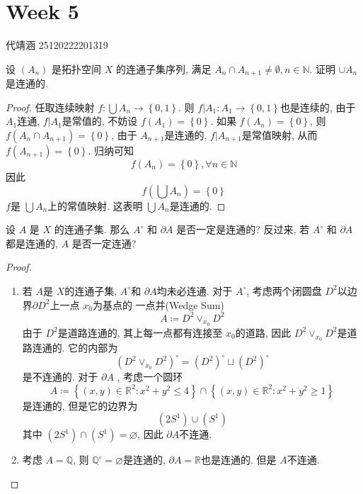 \documentclass[../main.tex]{subfiles}
\begin{document}
\ifSubfilesClassLoaded{

    
    \setcounter{chapter}{4}
}{}

\chapter{ Week 5 }
 代靖涵 25120222201319
\begin{exercise}{}{}
设 $(A_n)$ 是拓扑空间 $X$ 的连通子集序列, 满足 $A_n \cap A_{n+1} \neq \emptyset, n \in \mathbb{N}$. 证明 $\cup A_n$ 是连通的.
\end{exercise}

\begin{proof}
    任取连续映射 \(  f: \bigcup A_{n}\to \left\{ 0,1 \right\}  \). 则 \(  f|A_{1}: A_1\to \left\{ 0,1 \right\}  \)也是连续的, 由于 \(  A_1  \)连通, \(  f|A_{1}  \)是常值的, 不妨设 \(  f\left( A_1 \right)= \left\{ 0 \right\}   \).  如果 \(  f\left( A_{n} \right)= \left\{ 0 \right\}   \), 则 \(  f\left( A_{n}\cap A_{n+ 1} \right)= \left\{ 0 \right\}   \), 由于 \(  A_{n+ 1}  \)是连通的,  \(  f|A_{n+ 1}  \)是常值映射, 从而 \(  f\left( A_{n+ 1} \right)= \left\{ 0 \right\}   \). 归纳可知 \[
    f\left( A_{n} \right)=\left\{ 0 \right\},\forall n \in \mathbb{N}  
    \]因此 \[
    f\left( \bigcup A_{n} \right)= \left\{ 0 \right\} 
    \] \(  f  \)是 \(  \bigcup A_{n}  \)上的常值映射. 这表明 \(  \bigcup A_{n}  \)是连通的.            
\end{proof}
\begin{exercise}{}{}
设 $A$ 是 $X$ 的连通子集. 那么 $A^\circ$ 和 $\partial A$ 是否一定是连通的? 反过来, 若 $A^\circ$ 和 $\partial A$ 都是连通的, $A$ 是否一定连通?
\end{exercise}
\begin{proof}
    \begin{enumerate}
        \item 若 \(  A  \)是 \(  X  \)的连通子集,  \(  A^{\circ}  \)和 \(   \partial A  \)均未必连通. 对于 \(  A^{\circ}  \), 考虑两个闭圆盘 \(  D^{2}  \)以边界\(   \partial D^{2}  \)上一点 \(  x_0  \)为基点的   一点并(Wedge Sum) \[
    A\coloneqq     D^{2}\vee_{x_0} D^{2}
        \] 由于 \(  D^{2}  \)是道路连通的, 其上每一点都有连接至 \(  x_0  \)的道路, 因此 \(  D^{2}\vee _{x_0}D^{2}  \)是道路连通的.       它的内部为 \[
        \left( D^{2}\vee_{x_0} D^{2} \right)^{\circ}=  \left( D^{2} \right)^{\circ} \sqcup \left( D^{2} \right)^{\circ}  
        \]是不连通的. 对于 \(   \partial A \) , 考虑一个圆环 \[
    A\coloneqq     \left\{ \left( x,y \right)\in \mathbb{R} ^{2}: x^{2}+ y^{2}\le 4  \right\}\cap \left\{ \left( x,y \right)\in \mathbb{R} ^{2}: x^{2}+ y^{2}\ge 1  \right\}
        \]是连通的, 但是它的边界为 \[
        \left( 2S^{1} \right)\cup \left( S^{1} \right)  
        \]其中 \(  \left( 2S^{1} \right)\cap \left( S^{1} \right)= \varnothing    \),  因此 \(   \partial A  \)不连通.
        
        \item 考虑 \(  A= \mathbb{Q}   \), 则 \(  \mathbb{Q} ^{\circ}= \varnothing  \)是连通的,  \(   \partial A= \mathbb{R}   \)也是连通的. 但是 \(  A  \)不连通.    
    \end{enumerate}
    
\end{proof}
\end{document}
